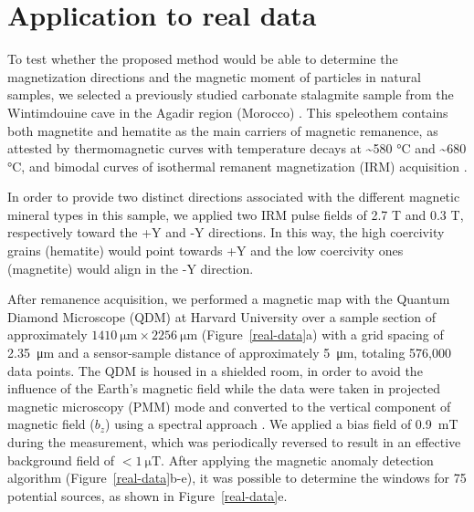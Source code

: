 \section{Application to real data}

To test whether the proposed method would be able to determine the
magnetization directions and the magnetic moment of particles in natural
samples, we selected a previously studied carbonate stalagmite sample from the
Wintimdouine cave in the Agadir region (Morocco) \citep{Ait2019Hydro}. This
speleothem contains both magnetite and hematite as the main carriers of
magnetic remanence, as attested by thermomagnetic curves with temperature
decays at {\textasciitilde}580 °C and {\textasciitilde}680 °C, and bimodal
curves of isothermal remanent magnetization (IRM) acquisition \citep{carmo2019speleothem}.

In order to provide two distinct directions associated with the different
magnetic mineral types in this sample, we applied two IRM pulse fields of 2.7 T
and 0.3 T, respectively toward the +Y and -Y directions. In this way, the high
coercivity grains (hematite) would point towards +Y and the low coercivity ones
(magnetite) would align in the -Y direction.

After remanence acquisition, we performed a magnetic map with the Quantum
Diamond Microscope (QDM) at Harvard University over a sample section of
approximately $\qty{1410}{\um} \times \qty{2256}{\um}$ (Figure~\ref{real-data}a) with a grid
spacing of \qty{2.35}{\um} and a sensor-sample distance of approximately \qty{5}{\um}, totaling
576,000 data points. The QDM is housed in a shielded room, in
order to avoid the influence of the Earth's magnetic field while the data were taken in projected magnetic microscopy (PMM) mode and converted to the vertical component of magnetic field ($b_z$) using a spectral approach \citep{Lima2009, Fu2020,
Glenn2017}. We applied a bias field of \qty{0.9}{\milli\tesla} during the measurement, which was periodically reversed to result in an effective background field of $< \qty{1}{\micro\tesla}$.  After applying the magnetic anomaly detection algorithm (Figure~\ref{real-data}b-e), it was
possible to determine the windows for 75 potential sources, as shown in Figure~\ref{real-data}e.

